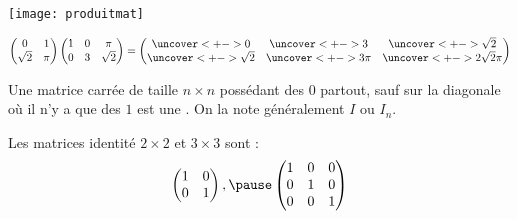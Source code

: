 \begin{frame}
  \begin{center}
    \texttt{[image: produitmat]}
  \end{center}
\end{frame}
\begin{frame}
  \begin{example}
    \begin{equation*}
      \begin{pmatrix}
        0       & 1               \\
        \sqrt 2 & \pi
      \end{pmatrix}
      \begin{pmatrix}
        1       & 0     & \pi     \\
        0 & 3 & \sqrt 2
      \end{pmatrix}
      =
      \begin{pmatrix}
        \uncover<+->{0} & \uncover<+->{3} & \uncover<+->{\sqrt 2}\\
        \uncover<+->{\sqrt 2} & \uncover<+->{3 \pi} & \uncover<+->{2\sqrt 2 \pi}
      \end{pmatrix}
    \end{equation*}
  \end{example}
\end{frame}
\begin{frame}
  \begin{definition}
  Une matrice carrée de taille \(n\times n\)\pause{} possédant des \(0\) partout, sauf\pause{} sur la diagonale où il n'y a que des \(1\)\pause{} est une . On la note généralement \(I\) ou \(I_{n}\).
\end{definition}\pause{}
\begin{example}
  Les matrices identité \(2\times 2\) et \(3\times 3\) sont :\pause{}
  \begin{equation*}
    \begin{pmatrix}
      1 & 0\\ 0& 1
    \end{pmatrix},\pause
    \begin{pmatrix}
      1 & 0&0\\0&1&0\\0& 0& 1
    \end{pmatrix}
\end{equation*}
\end{example}
\end{frame}
